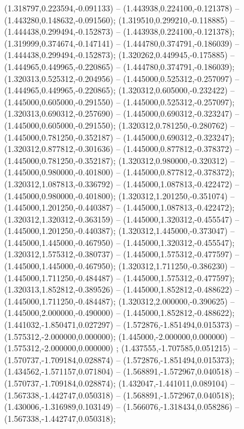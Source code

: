  (1.318797,0.223594,-0.091133) -- (1.443938,0.224100,-0.121378) -- (1.443280,0.148632,-0.091560);
 (1.319510,0.299210,-0.118885) -- (1.444438,0.299494,-0.152873) -- (1.443938,0.224100,-0.121378);
 (1.319999,0.374674,-0.147141) -- (1.444780,0.374791,-0.186039) -- (1.444438,0.299494,-0.152873);
 (1.320262,0.449945,-0.175885) -- (1.444965,0.449965,-0.220865) -- (1.444780,0.374791,-0.186039);
 (1.320313,0.525312,-0.204956) -- (1.445000,0.525312,-0.257097) -- (1.444965,0.449965,-0.220865);
 (1.320312,0.605000,-0.232422) -- (1.445000,0.605000,-0.291550) -- (1.445000,0.525312,-0.257097);
 (1.320313,0.690312,-0.257690) -- (1.445000,0.690312,-0.323247) -- (1.445000,0.605000,-0.291550);
 (1.320312,0.781250,-0.280762) -- (1.445000,0.781250,-0.352187) -- (1.445000,0.690312,-0.323247);
 (1.320312,0.877812,-0.301636) -- (1.445000,0.877812,-0.378372) -- (1.445000,0.781250,-0.352187);
 (1.320312,0.980000,-0.320312) -- (1.445000,0.980000,-0.401800) -- (1.445000,0.877812,-0.378372);
 (1.320312,1.087813,-0.336792) -- (1.445000,1.087813,-0.422472) -- (1.445000,0.980000,-0.401800);
 (1.320312,1.201250,-0.351074) -- (1.445000,1.201250,-0.440387) -- (1.445000,1.087813,-0.422472);
 (1.320312,1.320312,-0.363159) -- (1.445000,1.320312,-0.455547) -- (1.445000,1.201250,-0.440387);
 (1.320312,1.445000,-0.373047) -- (1.445000,1.445000,-0.467950) -- (1.445000,1.320312,-0.455547);
 (1.320312,1.575312,-0.380737) -- (1.445000,1.575312,-0.477597) -- (1.445000,1.445000,-0.467950);
 (1.320312,1.711250,-0.386230) -- (1.445000,1.711250,-0.484487) -- (1.445000,1.575312,-0.477597);
 (1.320313,1.852812,-0.389526) -- (1.445000,1.852812,-0.488622) -- (1.445000,1.711250,-0.484487);
 (1.320312,2.000000,-0.390625) -- (1.445000,2.000000,-0.490000) -- (1.445000,1.852812,-0.488622);
 (1.441032,-1.850471,0.027297) -- (1.572876,-1.851494,0.015373) -- (1.575312,-2.000000,0.000000);
 (1.445000,-2.000000,0.000000) -- (1.575312,-2.000000,0.000000) ;
 (1.437555,-1.707585,0.051215) -- (1.570737,-1.709184,0.028874) -- (1.572876,-1.851494,0.015373);
 (1.434562,-1.571157,0.071804) -- (1.568891,-1.572967,0.040518) -- (1.570737,-1.709184,0.028874);
 (1.432047,-1.441011,0.089104) -- (1.567338,-1.442747,0.050318) -- (1.568891,-1.572967,0.040518);
 (1.430006,-1.316989,0.103149) -- (1.566076,-1.318434,0.058286) -- (1.567338,-1.442747,0.050318);
